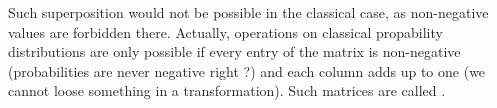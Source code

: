 Such superposition would not be possible in the classical case, as non-negative values are forbidden there. Actually, operations on classical propability distributions are only possible if every entry of the matrix is non-negative (probabilities are never negative right ?) and each column adds up to one (we cannot loose something in a transformation). Such matrices are called .